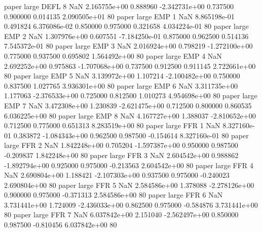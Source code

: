             paper      large     DEFL                 8                  NaN 2.165755e+00      0.888960 -2.342731e+00 0.737500 0.900000       0.014135 2.090505e+01 80
            paper      large      EMP                 1                  NaN 8.865198e-01      0.491824  6.376086e-02 0.850000 0.975000       0.321658 4.034224e-01 80
            paper      large      EMP                 2                  NaN 1.307976e+00      0.607551 -7.184250e-01 0.875000 0.962500       0.514136 7.545372e-01 80
            paper      large      EMP                 3                  NaN 2.016924e+00      0.798219 -1.272100e+00 0.775000 0.937500       0.695802 1.564492e+00 80
            paper      large      EMP                 4                  NaN 2.692252e+00      0.975863 -1.707068e+00 0.737500 0.912500       0.911145 2.722661e+00 80
            paper      large      EMP                 5                  NaN 3.139972e+00      1.107214 -2.100482e+00 0.750000 0.837500       1.027765 3.936301e+00 80
            paper      large      EMP                 6                  NaN 3.311735e+00      1.177063 -2.376533e+00 0.725000 0.812500       1.010273 4.954698e+00 80
            paper      large      EMP                 7                  NaN 3.472308e+00      1.230839 -2.621475e+00 0.712500 0.800000       0.860535 6.036225e+00 80
            paper      large      EMP                 8                  NaN 4.167727e+00      1.388037 -2.810652e+00 0.712500 0.775000       0.651313 8.283519e+00 80
            paper      large      FFR                 1                  NaN 8.327160e-01      0.383872 -1.084343e+00 0.962500 0.987500      -0.154614 8.327160e-01 80
            paper      large      FFR                 2                  NaN 1.842248e+00      0.705204 -1.597387e+00 0.950000 0.987500      -0.209837 1.842248e+00 80
            paper      large      FFR                 3                  NaN 2.604542e+00      0.988862 -1.892794e+00 0.925000 0.975000      -0.213563 2.604542e+00 80
            paper      large      FFR                 4                  NaN 2.690804e+00      1.188421 -2.107303e+00 0.937500 0.975000      -0.240023 2.690804e+00 80
            paper      large      FFR                 5                  NaN 2.584586e+00      1.378088 -2.278126e+00 0.900000 0.975000      -0.371313 2.584586e+00 80
            paper      large      FFR                 6                  NaN 3.731441e+00      1.724009 -2.436033e+00 0.862500 0.975000      -0.584876 3.731441e+00 80
            paper      large      FFR                 7                  NaN 6.037842e+00      2.151040 -2.562497e+00 0.850000 0.987500      -0.810456 6.037842e+00 80
